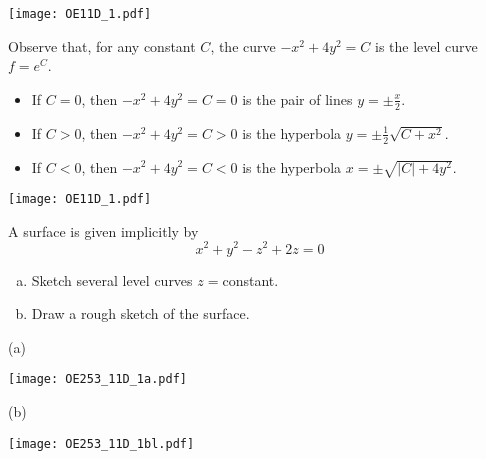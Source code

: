 \begin{answer}
\begin{center}
     \texttt{[image: OE11D\_1.pdf]}
\end{center}
\end{answer}

\begin{solution}
 Observe that, for any constant $C$, the curve $-x^2+4y^2=C$
is the level curve $f=e^C$.
\begin{itemize}
\item
If $C=0$, then $-x^2+4y^2=C=0$ is the pair of lines $y=\pm\frac{x}{2}$.
\item
If $C>0$, then $-x^2+4y^2=C>0$ is the hyperbola $y=\pm\frac{1}{2}\sqrt{C+x^2}$. 
\item
If $C<0$, then $-x^2+4y^2=C<0$ is the hyperbola $x=\pm\sqrt{|C|+4y^2}$. 
\end{itemize}

\begin{center}
     \texttt{[image: OE11D\_1.pdf]}
\end{center}

\end{solution}


\begin{question}[M253 2011D] %
A surface is given implicitly by
\begin{equation*}
x^2 + y^2 - z^2 + 2z = 0
\end{equation*}
\begin{enumerate}[(a)]
\item
Sketch several level curves $z = $constant.
\item
Draw a rough sketch of the surface. 
\end{enumerate}
\end{question}

%

\begin{answer}
(a)

\begin{center}
     \texttt{[image: OE253\_11D\_1a.pdf]}
\end{center}

(b)

\begin{center}
   \texttt{[image: OE253\_11D\_1bl.pdf]}\qquad\qquad
\end{center}
\end{answer}

